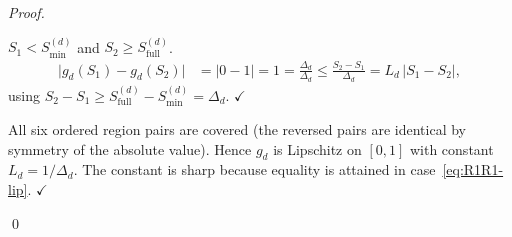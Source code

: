 \documentclass[12pt,openany]{book}
\numberwithin{equation}{chapter}
\theoremstyle{plain}
\theoremstyle{definition}
\theoremstyle{remark}
\def\mathcal#1{#1}%
\begin{document}
\begin{proof}
\begin{enumerate}
\begin{enumerate}
        $\mathcal{S}_1 < \mathcal{S}_{\min}^{(d)}$ and
        $\mathcal{S}_2 \geq \mathcal{S}_{\mathrm{full}}^{(d)}$.
        \begin{align}
          \bigl|g_d(\mathcal{S}_1)-g_d(\mathcal{S}_2)\bigr|
          &= |0 - 1| = 1 = \frac{\Delta_d}{\Delta_d}
          \leq \frac{\mathcal{S}_2 - \mathcal{S}_1}{\Delta_d}
          = L_d\,|\mathcal{S}_1-\mathcal{S}_2|,
          \label{eq:R0R2-lip}
        \end{align}
        using
        $\mathcal{S}_2 - \mathcal{S}_1
         \geq \mathcal{S}_{\mathrm{full}}^{(d)}-\mathcal{S}_{\min}^{(d)}
         = \Delta_d$.
        \hfill$\checkmark$
\end{enumerate}
All six ordered region pairs are covered (the reversed pairs are
identical by symmetry of the absolute value). Hence $g_d$ is
Lipschitz on $[0,1]$ with constant $L_d = 1/\Delta_d$.
The constant is sharp because equality is attained in
case~\eqref{eq:R1R1-lip}. \hfill$\checkmark$
\end{enumerate}
\qed
\end{proof}
\end{document}
